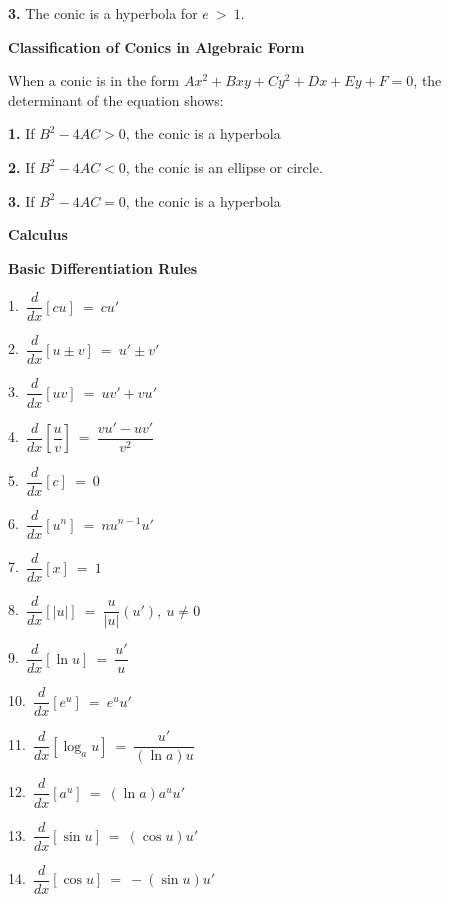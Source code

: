 \documentclass{article}
\begin{document}
\begin{large}
\hspace{0.2in} \textbf{3.} The conic is a hyperbola for $e\ >\ 1$.

\textbf{Classification of Conics in Algebraic Form}

When a conic is in the form $Ax^2+Bxy+Cy^2+Dx+Ey+F=0$, the determinant of the equation shows:

\textbf{1.} If $B^2-4AC>0$, the conic is a hyperbola

\textbf{2.} If $B^2-4AC<0$, the conic is an ellipse or circle.

\textbf{3.} If $B^2-4AC=0$, the conic is a hyperbola

\newpage

\chead{ }

\vspace*{\fill}

\begin{center}\textbf{\Huge{ Calculus }}\end{center}

\vspace*{\fill}

\newpage


\textbf{Basic Differentiation Rules}

\begin{multicols}{2}

1.\ $\dfrac{d}{dx}[cu]\ =\ cu'$

2.\ $\dfrac{d}{dx}[u\pm v]\ =\ u'\pm v'$

3.\ $\dfrac{d}{dx}[uv]\ =\ uv'+vu'$

4.\ $\dfrac{d}{dx}\left[\dfrac{u}{v}\right]\ =\ \dfrac{vu'-uv'}{v^{2}}$

5.\ $\dfrac{d}{dx}[c]\ =\ 0$

6.\ $\dfrac{d}{dx}\left[u^{n}\right]\ =\ nu^{n-1}u'$

7.\ $\dfrac{d}{dx}[x]\ =\ 1$

8.\ $\dfrac{d}{dx}[|u|]\ =\ \dfrac{u}{|u|}(u'),\ u\neq 0$

9.\ $\dfrac{d}{dx}[\ln u]\ =\ \dfrac{u'}{u}$

10.\ $\dfrac{d}{dx}\left[e^{u}\right]\ =\ e^{u}u'$

11.\ $\dfrac{d}{dx}[\log_{a}u]\ =\ \dfrac{u'}{(\ln a)u}$

12.\ $\dfrac{d}{dx}\left[a^{u}\right]\ =\ (\ln a)a^{u}u'$

13.\ $\dfrac{d}{dx}[\sin u]\ =\ (\cos u)u'$

14.\ $\dfrac{d}{dx}[\cos u]\ =\ -(\sin u)u'$


\end{multicols}
\end{large}
\end{document}
